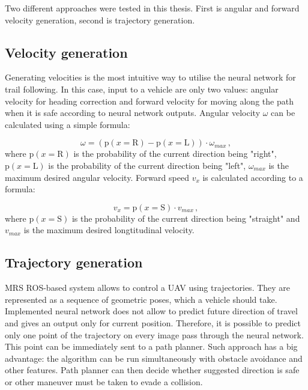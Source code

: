 Two different approaches were tested in this thesis. First is angular and forward velocity generation, second is trajectory generation. 

\subsection{Velocity generation}

Generating velocities is the most intuitive way to utilise the neural network for trail following. In this case, input to a vehicle are only two values: angular velocity for heading correction and forward velocity for moving along the path when it is safe according to neural network outputs. Angular velocity $\omega$ can be calculated using a simple formula:

\begin{equation}
	\omega = (\textrm{p}(x = \textrm{R}) - \textrm{p}(x = \textrm{L}))\cdot\omega_{max}\,,
\end{equation}
where $\textrm{p}(x = \textrm{R})$ is the probability of the current direction being "right", $\textrm{p}(x = \textrm{L})$ is the probability of the current direction being "left", $\omega_{max}$ is the maximum desired angular velocity. Forward speed $v_x$ is calculated according to a formula:

\begin{equation}
	v_x = \textrm{p}(x = \textrm{S})\cdot v_{max}\,,
\end{equation}
where $\textrm{p}(x = \textrm{S})$ is the probability of the current direction being "straight" and $v_{max}$ is the maximum desired longtitudinal velocity.


\subsection{Trajectory generation}

\acs{MRS} \acs{ROS}-based system allows to control a \acs{UAV} using trajectories. They are represented as a sequence of geometric poses, which a vehicle should take. Implemented neural network does not allow to predict future direction of travel and gives an output only for current position. Therefore, it is possible to predict only one point of the trajectory on every image pass through the neural network. This point can be immediately sent to a path planner. Such approach has a big advantage: the algorithm can be run simultaneously with obstacle avoidance and other features. Path planner can then decide whether suggested direction is safe or other maneuver must be taken to evade a collision.

